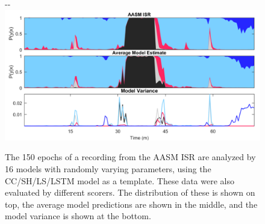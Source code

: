 \begin{figure}
\begin{adjustwidth*}{}{-\marginparsep-\marginparwidth}
    \includegraphics[width=\linewidth]{figures/paper-iii/Figure_2b}
    \caption[Evaluation of model on \acs{AASM} \acs{ISR}.]{The 150 epochs of a recording from the \ac{AASM} \ac{ISR} are analyzed by 16 models with randomly varying parameters, using the \ac{CC}/SH/LS/\ac{LSTM} model as a template. These data were also evaluated by  different scorers. The distribution of these is shown on top, the average model predictions are shown in the middle, and the model variance is shown at the bottom.}
    \label{fig:sleep-stages:paper-iii:figure-02b}
\end{adjustwidth*}
\end{figure}

